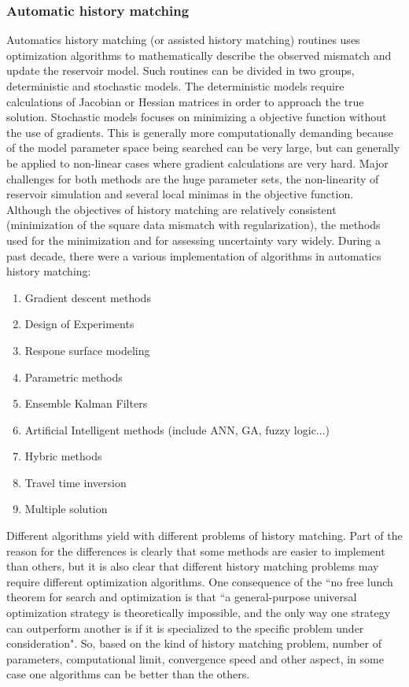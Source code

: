 \documentclass[12pt,a4paper]{report}
\begin{document}
\subsubsection{Automatic history matching\cite{His1}}
Automatics history matching (or assisted history matching) routines uses optimization algorithms to mathematically describe the observed mismatch and update the reservoir model. Such routines can be divided in two groups, deterministic and stochastic models. The deterministic models require calculations of Jacobian or Hessian matrices in order to approach the true solution. Stochastic models focuses on minimizing a objective function without the use of gradients. This is generally more computationally demanding because of the model parameter space being searched can be very large, but can generally be applied to non-linear cases where gradient calculations are very hard. Major challenges for both methods are the huge parameter sets, the non-linearity of reservoir simulation and several local minimas in the objective function.\\
Although the objectives of history matching are relatively consistent (minimization of the square data mismatch with regularization), the methods used for the minimization and for assessing uncertainty vary widely. 
During a past decade, there were a various implementation of algorithms in automatics history matching:
\begin{enumerate}
	\item Gradient descent methods
	\item Design of Experiments
	\item Respone surface modeling
	\item Parametric methods
	\item Ensemble Kalman Filters
	\item Artificial Intelligent methods (include ANN, GA, fuzzy logic...)
	\item Hybric methods
	\item Travel time inversion
	\item Multiple solution
\end{enumerate}
Different algorithms yield with different problems of history matching. Part of the reason for the differences is clearly that some methods are easier to implement than others, but it is also clear that different history matching problems may require different optimization algorithms. One consequence of the “no free lunch theorem for search and optimization is that “a general-purpose universal optimization strategy is theoretically impossible, and the only way one strategy can outperform another is if it is specialized to the specific problem under consideration"\cite{His4}. So, based on the kind of history matching problem, number of parameters, computational limit, convergence speed and other aspect,  in some case one algorithms can be better than the others.
\end{document}
